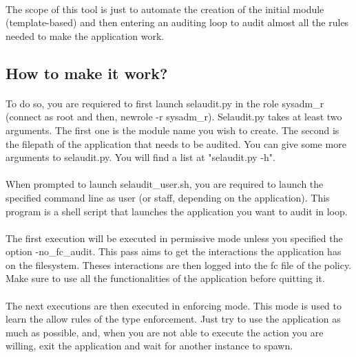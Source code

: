 \paragraph*{}
The scope of this tool is just to automate the creation of the initial module (template-based) 
and then entering an auditing loop to audit almost all the rules needed to make the application
work.

\subsection*{How to make it work?}

\paragraph*{}
To do so, you are requiered to first launch selaudit.py in the role sysadm\_r (connect as root and then, newrole -r sysadm\_r).
Selaudit.py takes at least two arguments. The first one is the module name you wish to create.
The second is the filepath of the application that needs to be audited.
You can give some more arguments to selaudit.py. You will find a list at "selaudit.py -h".

\paragraph*{}
When prompted to launch selaudit\_user.sh, you are required to launch the specified command line as user (or staff, depending on the application).
This program is a shell script that launches the application you want to audit in loop. 

\paragraph*{}
The first execution will be executed in permissive mode unless you specified the option -no\_fc\_audit.
This pass aims to get the interactions the application has on the filesystem. 
Theses interactions are then logged into the fc file of the policy.
Make sure to use all the functionalities of the application before quitting it.

\paragraph*{}
The next executions are then executed in enforcing mode. This mode is used to learn the allow rules of the type enforcement.
Just try to use the application as much as possible, and, when you are not able to execute the action you are willing, exit the
application and wait for another instance to spawn. 

